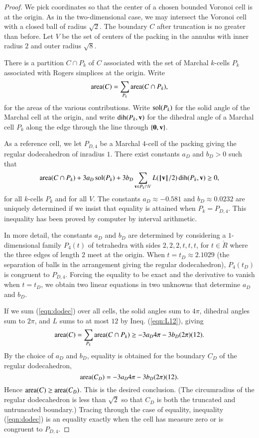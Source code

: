 \documentclass{llncs}
\def\area{\op{area}}
\begin{document}
\begin{proof}
  We pick coordinates so that the center of a chosen bounded Voronoi
  cell is at the origin.  As in the two-dimensional case, we may
  intersect the Voronoi cell with a closed ball of radius $\sqrt2$.
  The boundary $C$ after truncation is no greater than before.  Let
  $V$ be the set of centers of the packing in the annulus with inner
  radius $2$ and outer radius $\sqrt8$.

There is a partition $C\cap P_k$ of  $C$ associated with the set of
Marchal $k$-cells $P_k$ associated with  Rogers simplices at the origin. 
Write 
\[
\area(C) = \sum_{P_k} \area(C\cap P_k),
\]
for the areas of the various contributions.  Write $\operatorname{sol}(P_k)$ for the
solid angle of the Marchal cell at the origin, and write
$\operatorname{dih}(P_k,{\mathbf v})$ for the dihedral angle of a Marchal cell $P_k$ along
the edge through the line through $\{{\mathbf 0},{\mathbf v}\}$.

As a reference cell, we let $P_{D,4}$ be a Marchal $4$-cell of the
packing giving the regular dodecahedron of inradius $1$.  There exist
constants $a_D$ and $b_D>0$ such that
\begin{equation}\label{eqn:dodec}
\area(C\cap P_k) +  3 a_D \sol(P_k) + 
3 b_D \sum_{\v\in P_k\cap V} L(\normo{\v}/2)\dih(P_k,\v) \ge0,
\end{equation}
for all $k$-cells $P_k$ and for all $V$.  The constants $a_D\approx -0.581$ and
$b_D\approx 0.0232$ are uniquely determined if we insist that equality
is attained when $P_k = P_{D,4}$.  This inequality has been proved by
computer by interval arithmetic.  

In more detail, the constants $a_D$
and $b_D$ are determined by considering a $1$-dimensional family
$P_4(t)$ of tetrahedra with sides $2,2,2,t,t,t$, for $t\in \ring{R}$
where the three edges of length $2$ meet at the origin.  When
$t=t_D\approx 2.1029$ (the separation of balls in the arrangement
giving the regular dodecahedron), $P_4(t_D)$ is congruent to
$P_{D,4}$.  Forcing the equality to be exact and the derivative to
vanish when $t=t_D$, we obtain two linear equations in two unknowns
that determine $a_D$ and $b_D$.

If we sum (\ref{eqn:dodec}) over all cells, the solid angles sum to
$4\pi$, dihedral angles sum to $2\pi$, and $L$ sums to at most $12$ by
Ineq. (\ref{eqn:L12}), giving
\[
\area(C) = \sum_{P_k}\area(C\cap P_k) \ge -3 a_D 4\pi - 3 b_D (2\pi) (12).
\]
By the choice of $a_D$ and $b_D$, equality is obtained for the boundary
$C_D$ of the regular dodecahedron, 
\[
\area(C_D) = -3 a_D 4\pi - 3 b_D (2\pi) (12).
\]
Hence $\area(C)\ge \area(C_D)$. This is the desired conclusion.  (The
circumradius of the regular dodecahedron is less than $\sqrt2$ so that
$C_D$ is both the truncated and untruncated boundary.)  Tracing
through the case of equality, inequality (\ref{eqn:dodec}) is an
equality exactly when the cell has measure zero or is congruent to
$P_{D,4}$.
\end{proof}
\end{document}
